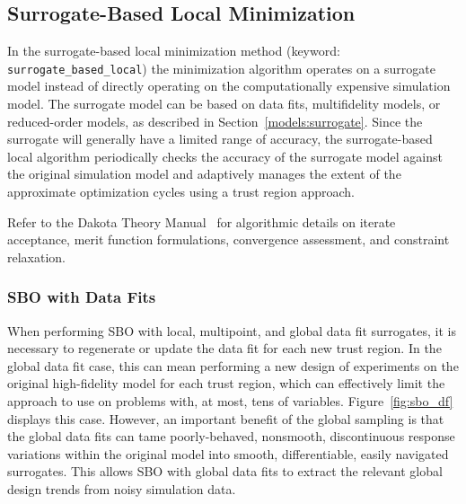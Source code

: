 \subsection{Surrogate-Based Local Minimization}\label{adv_meth:sbm:sblm}

In the surrogate-based local minimization method (keyword:
\texttt{surrogate\_based\_local}) the minimization algorithm operates
on a surrogate model instead of directly operating on the
computationally expensive simulation model. The surrogate model can be
based on data fits, multifidelity models, or reduced-order models, as
described in Section~\ref{models:surrogate}. Since the surrogate will
generally have a limited range of accuracy, the surrogate-based local
algorithm periodically checks the accuracy of the surrogate model
against the original simulation model and adaptively manages the
extent of the approximate optimization cycles using a trust region
approach.


Refer to the Dakota Theory Manual~\cite{TheoMan} for algorithmic
details on iterate acceptance, merit function formulations,
convergence assessment, and constraint relaxation.


\subsubsection{SBO with Data Fits}\label{adv_meth:sbm:sblm:surface}

When performing SBO with local, multipoint, and global data fit
surrogates, it is necessary to regenerate or update the data fit for
each new trust region.  In the global data fit case, this can mean
performing a new design of experiments on the original high-fidelity
model for each trust region, which can effectively limit the approach
to use on problems with, at most, tens of variables.
Figure~\ref{fig:sbo_df} displays this case.  However, an important
benefit of the global sampling is that the global data fits can tame
poorly-behaved, nonsmooth, discontinuous response variations within
the original model into smooth, differentiable, easily navigated
surrogates.  This allows SBO with global data fits to extract the
relevant global design trends from noisy simulation data.

